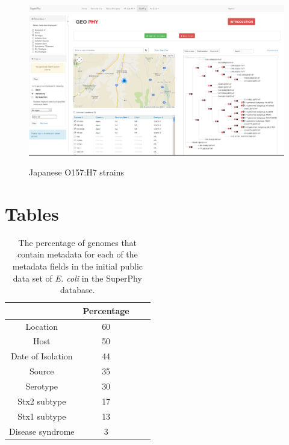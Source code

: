 \documentclass[doublespacing, linenumbers]{bmcart}
\begin{document}
\begin{backmatter}
\begin{figure}[h!]
  \caption{Japanese O157:H7 strains}
  \includegraphics[width=0.9\columnwidth]{images/geophy_o157.png}
  \label{fig:geophy}
\end{figure}


\section*{Tables}
\begin{table}[h!]
\caption{The percentage of genomes that contain metadata for each of the metadata fields in the initial public data set of \textit{E. coli} in the SuperPhy database.}
\label{tab:metadata}
      \begin{tabular}{cccc}
        \hline
           & Percentage\\ \hline
        Location & 60\\
        Host & 50\\
        Date of Isolation & 44\\
        Source & 35\\
        Serotype & 30\\
        Stx2 subtype & 17\\
        Stx1 subtype & 13\\
        Disease syndrome & 3\\ 
      \end{tabular}
\end{table}



\end{backmatter}
\end{document}

